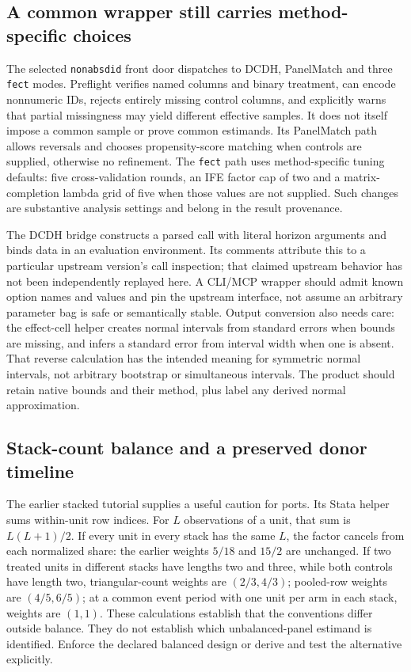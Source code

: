 \subsection{A common wrapper still carries method-specific choices}

The selected \texttt{nonabsdid} front door dispatches to DCDH, PanelMatch and three \texttt{fect} modes. Preflight verifies
named columns and binary treatment, can encode nonnumeric IDs, rejects entirely missing control columns, and explicitly
warns that partial missingness may yield different effective samples. It does not itself impose a common sample or prove
common estimands. Its PanelMatch path allows reversals and chooses propensity-score matching when controls are supplied,
otherwise no refinement. The \texttt{fect} path uses method-specific tuning defaults: five cross-validation rounds,
an IFE factor cap of two and a matrix-completion lambda grid of five when those values are not supplied. Such changes are
substantive analysis settings and belong in the result provenance.~\citep{exec28_panel_delegates}

The DCDH bridge constructs a parsed call with literal horizon arguments and binds data in an evaluation environment. Its
comments attribute this to a particular upstream version's call inspection; that claimed upstream behavior has not been
independently replayed here. A CLI/MCP wrapper should admit known option names and values and pin the upstream interface,
not assume an arbitrary parameter bag is safe or semantically stable. Output conversion also needs care: the effect-cell
helper creates normal intervals from standard errors when bounds are missing, and infers a standard error from interval
width when one is absent. That reverse calculation has the intended meaning for symmetric normal intervals, not arbitrary
bootstrap or simultaneous intervals. The product should retain native bounds and their method, plus label any derived
normal approximation.~\citep{exec28_panel_delegates}

\subsection{Stack-count balance and a preserved donor timeline}

The earlier stacked tutorial supplies a useful caution for ports. Its Stata helper sums within-unit row indices. For
$L$ observations of a unit, that sum is $L(L+1)/2$. If every unit in every stack has the same $L$, the factor cancels
from each normalized share: the earlier weights $5/18$ and $15/2$ are unchanged. If two treated units in different stacks
have lengths two and three, while both controls have length two, triangular-count weights are $(2/3,4/3)$; pooled-row
weights are $(4/5,6/5)$; at a common event period with one unit per arm in each stack, weights are $(1,1)$.
These calculations establish that the conventions differ outside balance. They do not establish which unbalanced-panel
estimand is identified. Enforce the declared balanced design or derive and test the alternative explicitly.
\citep{exec28_panel_delegate_reference}

